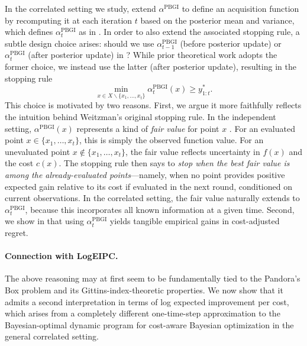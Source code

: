 In the correlated setting we study, \citet{xie2024cost} extend $\alpha^{\mathrm{PBGI}}$ to define an acquisition function by recomputing it at each iteration $t$ based on the posterior mean and variance, which defines $\alpha^{\mathrm{PBGI}}_t$ as in .
In order to also extend the associated stopping rule, a subtle design choice arises: should we use $\alpha_{t-1}^{\mathrm{PBGI}}$ (before posterior update) or $\alpha_t^{\mathrm{PBGI}}$ (after posterior update) in ?
While prior theoretical work \citep{gergatsouli2023weitzman} adopts the former choice, we instead use the latter (after posterior update), resulting in the stopping rule
\begin{equation}
\label{eqn:PBGI_stopping}
\min_{x\in X\backslash\{x_1,\dots,x_t\}}\alpha_t^{\mathrm{PBGI}}(x) \geq y^*_{1:t}.  
\end{equation}
This choice is motivated by two reasons. First, we argue it more faithfully reflects the intuition behind Weitzman’s original stopping rule. 
In the independent setting, $\alpha^{\mathrm{PBGI}}(x)$ represents a kind of \emph{fair value} for point $x$ \citep{kleinberg2016descending}.
For an evaluated point $x \in \{x_1, \dots, x_t\}$, this is simply the observed function value.
For an unevaluated point $x \not\in \{x_1, \dots, x_t\}$, the fair value reflects uncertainty in $f(x)$ and the cost $c(x)$.
The stopping rule  then says to \emph{stop when the best fair value is among the already-evaluated points}---namely, when no point provides positive expected gain relative to its cost if evaluated in the next round, conditioned on current observations. 
In the correlated setting, the fair value naturally extends to $\alpha_t^{\mathrm{PBGI}}$, because this incorporates all known information at a given time.
Second, we show in  that using $\alpha_t^{\mathrm{PBGI}}$ yields tangible empirical gains in cost-adjusted regret.

\paragraph{Connection with LogEIPC.}

The above reasoning may at first seem to be fundamentally tied to the Pandora's Box problem and its Gittins-index-theoretic properties.
We now show that it admits a second interpretation in terms of log expected improvement per cost, which arises from a completely different one-time-step approximation to the Bayesian-optimal dynamic program for cost-aware Bayesian optimization in the general correlated setting.

